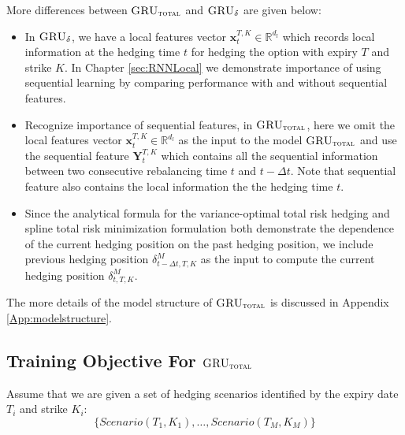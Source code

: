 \documentclass[letterpaper,12pt,titlepage,oneside,final]{book}
\numberwithin{equation}{section}
\theoremstyle{definition}
\newcommand{\model}{\textsc{GRU}_\delta}
\newcommand{\modelT}{\textsc{GRU}_{\textsc{total}}}
\newcommand{\vx}{\mathbf{x}}
\newcommand{\DT}{\Delta t}
\newcommand{\Real}{\mathbb{R}}
\begin{document}
More differences between $\modelT$ and $\model$ are given below:
\begin{itemize}
	
	\item In $\model$, we have a local features vector $\vx^{T,K}_{t} \in \Real^{d_l}$ which records local information at the hedging time $t$ for hedging the option with expiry $T$ and strike $K$. In Chapter \ref{sec:RNNLocal} we demonstrate importance of using sequential learning by  comparing performance with and without sequential features. 
	
	\item Recognize importance of sequential features, in $\modelT$, here we omit the local features vector $\vx^{T,K}_{t} \in \Real^{d_l}$ as the input to the model $\modelT$ and use the sequential feature  $\mathbf{Y}_{t}^{T,K}$ which contains all the sequential information between two consecutive rebalancing time $t$ and $t-\DT$. 
	Note that sequential feature also contains the local information the the hedging time $t$.
	
	\item Since the analytical formula for the variance-optimal total risk hedging \cite{schweizer1995variance} and spline total risk minimization formulation \cite{coleman2007total} both  demonstrate the dependence of the current hedging position on the past hedging position, we include previous hedging position $\delta^{M}_{t-\Delta t,T,K}$ as the input to compute the current hedging position $\delta^{M}_{t,T,K}$. 
	
\end{itemize}

The more details of the  model structure of $\modelT$ is discussed in Appendix \ref{App:modelstructure}.


\subsection{Training Objective For $\modelT$}
\label{sec:TotalModelObj}
Assume that we are given  a set  of hedging scenarios identified by the expiry date $T_i$ and strike $K_i$:
\[
\{Scenario(T_1,K_1), \dots, Scenario(T_M,K_M)\}	
\]
\end{document}
